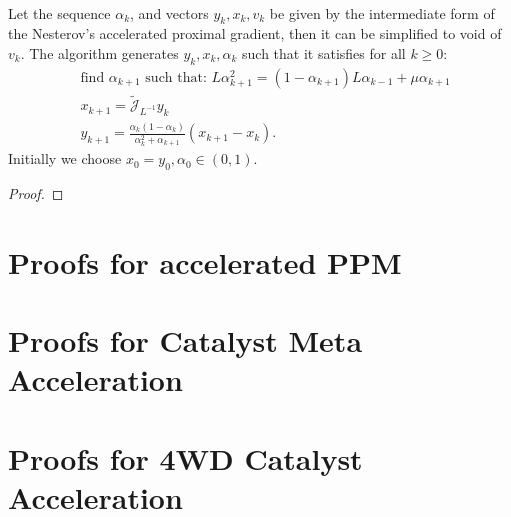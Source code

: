 \documentclass[12pt]{article}
\begin{document}
    \begin{theorem}
        \; \\
        Let the sequence $\alpha_k$, and vectors $y_k, x_k, v_k$ be given by the intermediate form of the Nesterov's accelerated proximal gradient, then it can be simplified to void of $v_k$. 
        The algorithm generates $y_k, x_k, \alpha_k$ such that it satisfies for all $k \ge 0$: 
        \begin{align*}
            & \text{find } \alpha_{k + 1} \text{ such that: }L \alpha_{k + 1}^2 = (1 - \alpha_{k + 1})L \alpha_{k - 1} + \mu \alpha_{k + 1}
            \\
            & x_{k + 1} = \widetilde {\mathcal J}_{L^{-1}} y_k
            \\
            & y_{k + 1} = \frac{\alpha_k(1 - \alpha_k)}{\alpha_k^2 + \alpha_{k + 1}}(x_{k + 1} - x_k). 
        \end{align*}
        Initially we choose $x_0 = y_0, \alpha_0 \in (0, 1)$. 
    \end{theorem}
    \begin{proof}
        
    \end{proof}
        
    
    
    
\section{Proofs for accelerated PPM}


\section{Proofs for Catalyst Meta Acceleration}


\section{Proofs for 4WD Catalyst Acceleration}
\end{document}
